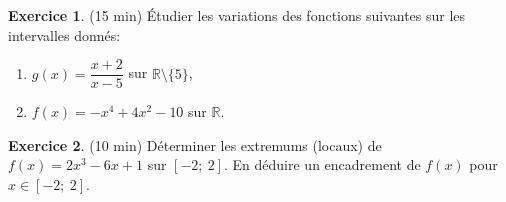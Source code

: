 \documentclass{exam}
\theoremstyle{definition}
\newtheorem{exercice}{Exercice}
\begin{document}

\begin{exercice}{(15 min)}
Étudier les variations des fonctions suivantes sur les intervalles donnés:
\begin{enumerate}
    \item $g(x) = \dfrac{x+2}{x-5}$ sur $\mathbb{R} \setminus \{5\}$,
    \item $f(x) = -x^4 + 4x^2 - 10$ sur $\mathbb{R}$.
\end{enumerate}
\end{exercice}

\begin{exercice}(10 min)
Déterminer les extremums (locaux) de $f(x) = 2x^3 - 6x + 1$ sur $[-2;\ 2]$. En déduire un encadrement de $f(x)$ pour $x \in [-2;\ 2]$.
\end{exercice}
\end{document}
